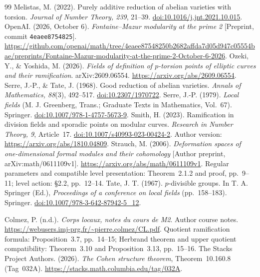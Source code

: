 \begin{thebibliography}{99}
Melistas, M. (2022). Purely additive reduction of abelian varieties with torsion. \emph{Journal of Number Theory, 239}, 21--39. \href{https://doi.org/10.1016/j.jnt.2021.10.015}{doi:10.1016/j.jnt.2021.10.015}.
OpenAI. (2026, October 6). \emph{Fontaine--Mazur modularity at the prime 2} [Preprint, commit \texttt{4eaee8754825}]. \url{https://github.com/openai/math/tree/4eaee87548250b2682affda7d05d947c05554bae/preprints/Fontaine-Mazur-modularity-at-the-prime-2-October-6-2026}.
Ozeki, Y., \& Yoshida, M. (2026). \emph{Fields of definition of $p$-torsion points of elliptic curves and their ramification}. arXiv:2609.06554. \url{https://arxiv.org/abs/2609.06554}.
Serre, J.-P., \& Tate, J. (1968). Good reduction of abelian varieties. \emph{Annals of Mathematics, 88}(3), 492--517. \href{https://doi.org/10.2307/1970722}{doi:10.2307/1970722}.
Serre, J.-P. (1979). \emph{Local fields} (M. J. Greenberg, Trans.; Graduate Texts in Mathematics, Vol.~67). Springer. \href{https://doi.org/10.1007/978-1-4757-5673-9}{doi:10.1007/978-1-4757-5673-9}.
Smith, H. (2023). Ramification in division fields and sporadic points on modular curves. \emph{Research in Number Theory, 9}, Article~17. \href{https://doi.org/10.1007/s40993-023-00424-2}{doi:10.1007/s40993-023-00424-2}. Author version: \url{https://arxiv.org/abs/1810.04809}.
Strauch, M. (2006). \emph{Deformation spaces of one-dimensional formal modules and their cohomology} [Author preprint, arXiv:math/0611109v1]. \url{https://arxiv.org/abs/math/0611109v1}. Regular parameters and compatible level presentation: Theorem~2.1.2 and proof, pp.~9--11; level action: \S2.2, pp.~12--14.
Tate, J. T. (1967). $p$-divisible groups. In T. A. Springer (Ed.), \emph{Proceedings of a conference on local fields} (pp.~158--183). Springer. \href{https://doi.org/10.1007/978-3-642-87942-5_12}{doi:10.1007/978-3-642-87942-5\_12}.




Colmez, P. (n.d.). \emph{Corps locaux, notes du cours de M2}. Author course notes. \url{https://webusers.imj-prg.fr/~pierre.colmez/CL.pdf}. Quotient ramification formula: Proposition~3.7, pp.~14--15; Herbrand theorem and upper quotient compatibility: Theorem~3.10 and Proposition~3.13, pp.~15--16.
The Stacks Project Authors. (2026). \emph{The Cohen structure theorem}, Theorem~10.160.8 (Tag~032A). \url{https://stacks.math.columbia.edu/tag/032A}.


\end{thebibliography}
